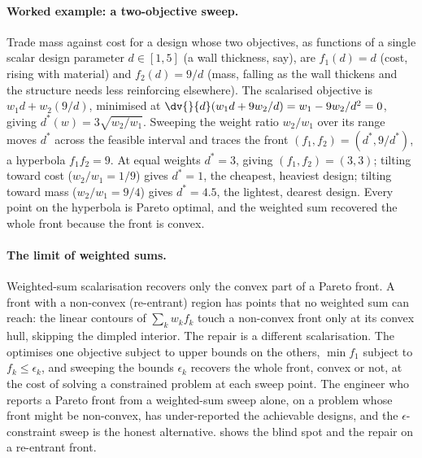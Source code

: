 \paragraph{Worked example: a two-objective sweep.}
Trade mass against cost for a design whose two objectives, as functions
of a single scalar design parameter $d \in [1, 5]$ (a wall thickness,
say), are $f_{1}(d) = d$ (cost, rising with material) and $f_{2}(d) =
9/d$ (mass, falling as the wall thickens and the structure needs less
reinforcing elsewhere). The scalarised objective is $w_{1} d + w_{2}
(9/d)$, minimised at $\dv{}{d}(w_{1} d + 9 w_{2}/d) = w_{1} - 9 w_{2}/
d^{2} = 0$, giving $d^{*}(w) = 3 \sqrt{w_{2}/w_{1}}$. Sweeping the
weight ratio $w_{2}/w_{1}$ over its range moves $d^{*}$ across the
feasible interval and traces the front $(f_{1}, f_{2}) = (d^{*},
9/d^{*})$, a hyperbola $f_{1} f_{2} = 9$. At equal weights $d^{*} = 3$,
giving $(f_{1}, f_{2}) = (3, 3)$; tilting toward cost ($w_{2}/w_{1} =
1/9$) gives $d^{*} = 1$, the cheapest, heaviest design; tilting toward
mass ($w_{2}/w_{1} = 9/4$) gives $d^{*} = 4.5$, the lightest, dearest
design. Every point on the hyperbola is Pareto optimal, and the
weighted sum recovered the whole front because the front is convex.

\paragraph{The limit of weighted sums.}
Weighted-sum scalarisation recovers only the convex part of a Pareto
front. A front with a non-convex (re-entrant) region has points that no
weighted sum can reach: the linear contours of $\sum_{k} w_{k} f_{k}$
touch a non-convex front only at its convex hull, skipping the dimpled
interior. The repair is a different scalarisation. The
 optimises one objective subject
to upper bounds on the others, $\min f_{1}$ subject to $f_{k} \leq
\epsilon_{k}$, and sweeping the bounds $\epsilon_{k}$ recovers the
whole front, convex or not, at the cost of solving a constrained
problem at each sweep point. The engineer who reports a Pareto front
from a weighted-sum sweep alone, on a problem whose front might be
non-convex, has under-reported the achievable designs, and the
$\epsilon$-constraint sweep is the honest alternative.
 shows the blind spot and the
repair on a re-entrant front.



